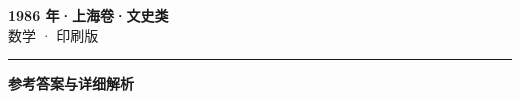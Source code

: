 \documentclass[zihao=5, a4paper]{ctexart}
\begin{document}
\begin{center}
  {\Large\bfseries 1986 年·上海卷·文史类}\\[4pt]
  {\large 数学 · 印刷版}
\end{center}
\medskip
{}

\par\bigskip\hrule\bigskip
{}
\begin{center}{\large\bfseries 参考答案与详细解析}\end{center}
\smallskip

\end{document}
